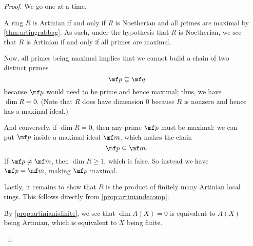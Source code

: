 \begin{proof}
	We go one at a time.
	\begin{listalph}
		\item A ring $R$ is Artinian if and only if $R$ is Noetherian and all primes are maximal by \autoref{thm:artingrabbag}. As such, under the hypothesis that $R$ is Noetherian, we see that $R$ is Artinian if and only if all primes are maximal.
		
		Now, all primes being maximal implies that we cannot build a chain of two distinct primes
		\[\mf p\subsetneq\mf q\]
		because $\mf p$ would need to be prime and hence maximal; thus, we have $\dim R=0$. (Note that $R$ does have dimension $0$ because $R$ is nonzero and hence has a maximal ideal.)

		And conversely, if $\dim R=0$, then any prime $\mf p$ must be maximal: we can put $\mf p$ inside a maximal ideal $\mf m$, which makes the chain
		\[\mf p\subseteq\mf m.\]
		If $\mf p\ne\mf m$, then $\dim R\ge1$, which is false. So instead we have $\mf p=\mf m$, making $\mf p$ maximal.

		Lastly, it remains to show that $R$ is the product of finitely many Artinian local rings. This follows directly from \autoref{prop:artiniandecomp}.

		\item By \autoref{prop:artinianisfinite}, we see that $\dim A(X)=0$ is equivalent to $A(X)$ being Artinian, which is equivalent to $X$ being finite.
		\qedhere
	\end{listalph}
\end{proof}

